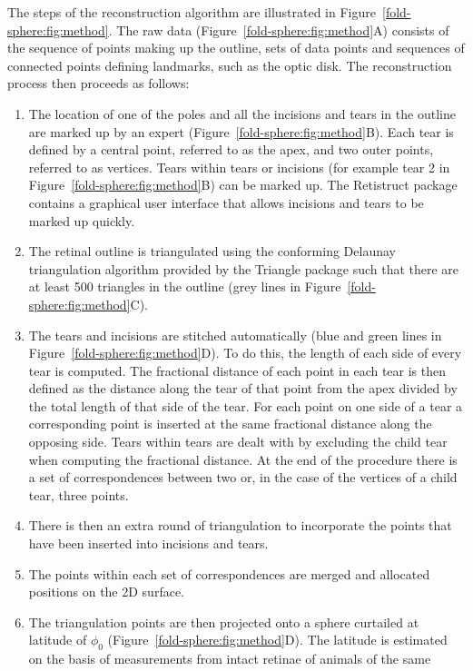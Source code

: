 \documentclass[10pt]{article}
\begin{document}
The steps of the reconstruction algorithm are illustrated in
Figure~\ref{fold-sphere:fig:method}. The raw data
(Figure~\ref{fold-sphere:fig:method}A) consists of the sequence of
points making up the outline, sets of data points and sequences of
connected points defining landmarks, such as the optic disk. The
reconstruction process then proceeds as follows:
\begin{enumerate}
\item The location of one of the poles and all the incisions and tears
  in the outline are marked up by an expert
  (Figure~\ref{fold-sphere:fig:method}B). Each tear is defined by a
  central point, referred to as the apex, and two outer points,
  referred to as vertices.  Tears within tears or incisions (for
  example tear 2 in Figure~\ref{fold-sphere:fig:method}B) can be
  marked up. The Retistruct package contains a graphical user
  interface that allows incisions and tears to be marked up quickly.
\item The retinal outline is triangulated using the conforming
  Delaunay triangulation algorithm provided by the Triangle package
  \cite{Shew96tria} such that there are at least 500 triangles in
  the outline (grey lines in Figure~\ref{fold-sphere:fig:method}C).
\item The tears and incisions are stitched automatically (blue and
  green lines in Figure~\ref{fold-sphere:fig:method}D). To do this,
  the length of each side of every tear is computed. The fractional
  distance of each point in each tear is then defined as the distance
  along the tear of that point from the apex divided by the total
  length of that side of the tear. For each point on one side of a
  tear a corresponding point is inserted at the same fractional
  distance along the opposing side. Tears within tears are dealt with
  by excluding the child tear when computing the fractional
  distance. At the end of the procedure there is a set of
  correspondences between two or, in the case of the vertices of a
  child tear, three points.
\item There is then an extra round of triangulation to incorporate the
  points that have been inserted into incisions and tears.
\item The points within each set of correspondences are merged and
  allocated positions on the 2D surface.
\item The triangulation points are then projected onto a sphere
  curtailed at latitude of $\phi_0$
  (Figure~\ref{fold-sphere:fig:method}D). The latitude is estimated on
  the basis of measurements from intact retinae of animals of the same

\end{enumerate}
\end{document}
